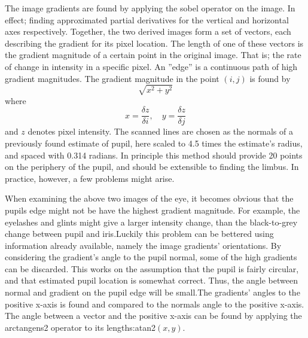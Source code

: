 The image gradients are found by applying the sobel operator on the image. In
effect; finding approximated partial derivatives for the vertical and
horizontal axes respectively. Together, the two derived images form a set of
vectors, each describing the gradient for its pixel location. The length of one
of these vectors is the gradient magnitude of a certain point in the original
image. That is; the rate of change in intensity in a specific pixel. An
''edge'' is a continuous path of high gradient magnitudes. The gradient
magnitude in the point $(i,j)$ is found by $$\sqrt{x^2+y^2}$$ where $$x =
\frac{\delta z}{\delta i}, \quad y = \frac{\delta z}{\delta j}$$ and $z$
denotes pixel intensity. The scanned lines are chosen as the normals of a
previously found estimate of pupil, here scaled to 4.5 times the estimate’s
radius, and spaced with 0.314 radians. In principle this method should provide
20 points on the periphery of the pupil, and should be extensible to finding
the limbus. In practice, however, a few problems might arise.

When examining the above two images of the eye, it becomes obvious that the
pupils edge might not be have the highest gradient magnitude. For example, the
eyelashes and glints might give a larger intensity change, than the
black-to-grey change between pupil and iris.Luckily this problem can be
bettered using information already available, namely the image gradients’
orientations. By considering the gradient’s angle to the pupil normal, some of
the high gradients can be discarded. This works on the assumption that the
pupil is fairly circular, and that estimated pupil location is somewhat
correct. Thus, the angle between normal and gradient on the pupil edge will be
small.The gradients’ angles to the positive x-axis is found and compared to the
normals angle to the positive x-axis. The angle between a vector and the
positive x-axis can be found by applying the arctangens2 operator to its
lengths:atan2$(x,y)$.


